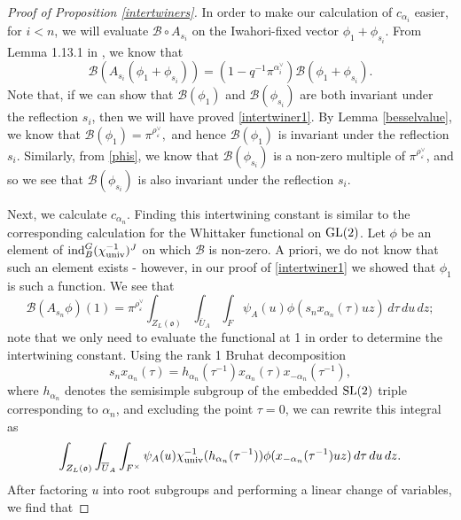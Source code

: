 \documentclass[11pt,letterpaper]{article}
\newcommand{\calB}{\mathcal{B}}
\newcommand{\ve}{\varepsilon}
\newcommand{\goth}{\mathfrak}
\newcommand{\GL}{\textup{GL}}
\newcommand{\SL}{\textup{SL}}
\newcommand{\ind}{\textup{ind}}
\theoremstyle{remark}
\numberwithin{equation}{section}
\begin{document}
\begin{proof}[Proof of Proposition \ref{intertwiners}]
In order to make our calculation of $c_{\alpha_i}$ easier, for $i<n$, we will evaluate $\calB \circ A_{s_i}$ on the Iwahori-fixed vector $\phi_1+\phi_{s_i}$. From Lemma 1.13.1 in \cite{HKP}, we know that $$\calB(A_{s_i}(\phi_1 + \phi_{s_i})) = (1-q^{-1}\pi^{\alpha_i^{\vee}})\calB(\phi_1 + \phi_{s_i}).$$ Note that, if we can show that $\calB(\phi_1)$ and $\calB(\phi_{s_i})$ are both invariant under the reflection $s_i$, then we will have proved \eqref{intertwiner1}. By Lemma \ref{besselvalue}, we know that $\calB(\phi_1) = \pi^{\rho_{\ve}^{\vee}},$ and hence $\calB(\phi_1)$ is invariant under the reflection $s_i$. Similarly, from \eqref{phis}, we know that $\calB(\phi_{s_i})$ is a non-zero multiple of $\pi^{\rho_{\ve}^{\vee}}$, and so we see that $\calB(\phi_{s_i})$ is also invariant under the reflection $s_i$.%



Next, we calculate $c_{\alpha_n}$. Finding this intertwining constant is similar to the corresponding calculation for the Whittaker functional on $\GL(2)$. Let $\phi$ be an element of $\ind_B^G(\chi_{\textup{univ}}^{-1})^J$ on which $\calB$ is non-zero. A priori, we do not know that such an element exists - however, in our proof of \eqref{intertwiner1} we showed that $\phi_{1}$ is such a function. We see that $$\calB(A_{s_{n}}\phi)(1) = \pi^{\rho_{\ve}^{\vee}} \int_{Z_L(\goth{o})} \int_{\overline{U}_A} \int_{F}\psi_A(u) \phi(s_nx_{\alpha_n}(\tau)uz)\,d\tau\,du\,dz;$$ note that we only need to evaluate the functional at 1 in order to determine the intertwining constant. Using the rank 1 Bruhat decomposition $$s_nx_{\alpha_n}(\tau) = h_{\alpha_n}(\tau^{-1})x_{\alpha_n}(\tau) x_{-\alpha_n}(\tau^{-1}),$$ where $h_{\alpha_n}$ denotes the semisimple subgroup of the embedded $\SL(2)$ triple corresponding to $\alpha_n$, and excluding the point $\tau = 0$, we can rewrite this integral as $$\int_{Z_L(\goth{o})}\int_{\overline{U}_A} \int_{F^{\times}}\psi_A(u)\chi_{\textup{univ}}^{-1}(h_{\alpha_n}(\tau^{-1}))\phi(x_{-\alpha_n}(\tau^{-1})uz)\,d\tau\,du\,dz.$$ After factoring $u$ into root subgroups and performing a linear change of variables, we find that


\end{proof}
\end{document}
